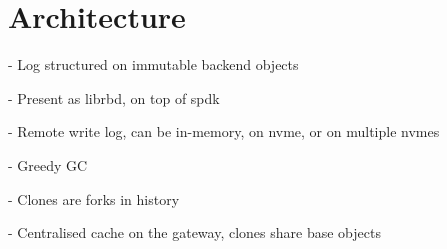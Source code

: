 \section{Architecture}

- Log structured on immutable backend objects

- Present as librbd, on top of spdk

- Remote write log, can be in-memory, on nvme, or on multiple nvmes

- Greedy GC

- Clones are forks in history

- Centralised cache on the gateway, clones share base objects
